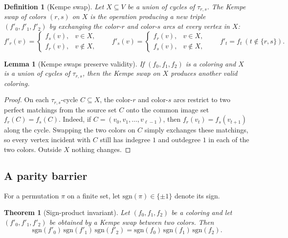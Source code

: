 \documentclass[11pt]{article}
\newtheorem{theorem}{Theorem}
\newtheorem{lemma}{Lemma}
\newtheorem{definition}{Definition}
\begin{document}
\begin{definition}[Kempe swap]
Let $X\subseteq V$ be a union of cycles of $\tau_{r,s}$.
The \emph{Kempe swap of colors $(r,s)$ on $X$} is the operation producing a new triple $(f'_0,f'_1,f'_2)$ by exchanging the color-$r$ and color-$s$ arcs at every vertex in $X$:
\[
f'_r(v)=
\begin{cases}
f_s(v), & v\in X,\\
f_r(v), & v\notin X,
\end{cases}
\qquad
f'_s(v)=
\begin{cases}
f_r(v), & v\in X,\\
f_s(v), & v\notin X,
\end{cases}
\qquad
f'_t=f_t\ (t\notin\{r,s\}).
\]
\end{definition}

\begin{lemma}[Kempe swaps preserve validity]\label{lem:kempe-valid}
If $(f_0,f_1,f_2)$ is a coloring and $X$ is a union of cycles of $\tau_{r,s}$, then the Kempe swap on $X$ produces another valid coloring.
\end{lemma}

\begin{proof}
On each $\tau_{r,s}$-cycle $C\subseteq X$, the color-$r$ and color-$s$ arcs restrict to two perfect matchings from the source set $C$ onto the common image set $f_r(C)=f_s(C)$.
Indeed, if $C=(v_0,v_1,\dots,v_{\ell-1})$, then $f_r(v_t)=f_s(v_{t+1})$ along the cycle.
Swapping the two colors on $C$ simply exchanges these matchings, so every vertex incident with $C$ still has indegree $1$ and outdegree $1$ in each of the two colors.
Outside $X$ nothing changes.
\end{proof}

\subsection{A parity barrier}
For a permutation $\pi$ on a finite set, let $\mathrm{sgn}(\pi)\in\{\pm1\}$ denote its sign.

\begin{theorem}[Sign-product invariant]\label{thm:sign-invariant}
Let $(f_0,f_1,f_2)$ be a coloring and let $(f'_0,f'_1,f'_2)$ be obtained by a Kempe swap between two colors.
Then
\[
\mathrm{sgn}(f'_0)\,\mathrm{sgn}(f'_1)\,\mathrm{sgn}(f'_2)
=
\mathrm{sgn}(f_0)\,\mathrm{sgn}(f_1)\,\mathrm{sgn}(f_2).
\]
\end{theorem}
\end{document}
